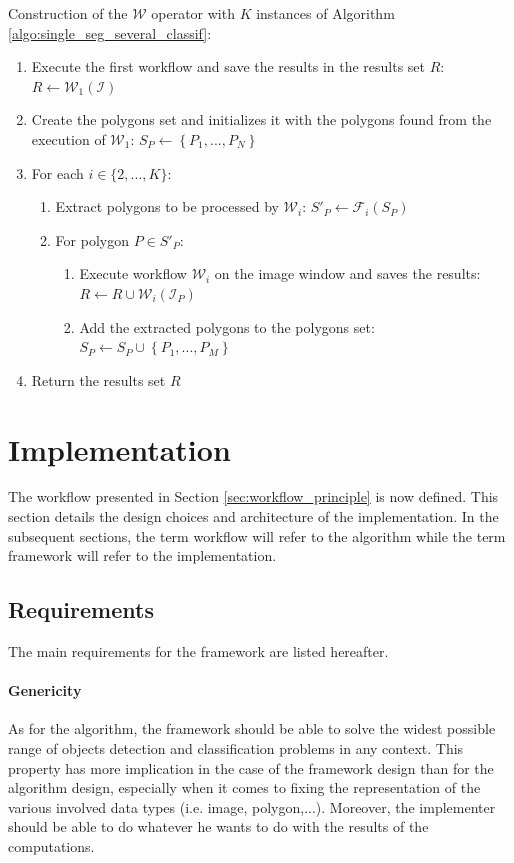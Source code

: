 \begin{algorithm} \label{algo:chaining_workflows}
	Construction of the $\mathcal{W}$ operator with $K$ instances of Algorithm \ref{algo:single_seg_several_classif}:

	\begin{enumerate}
		\item Execute the first workflow and save the results in the results set $R$: $R \leftarrow \mathcal{W}_1(\mathcal{I})$
		\item Create the polygons set and initializes it with the polygons found from the execution of $\mathcal{W}_1$: $S_P \leftarrow \left\{P_1, ..., P_N\right\}$
		\item For each $i \in \{2, ..., K\}$:
		\begin{enumerate}
			\item Extract polygons to be processed by $\mathcal{W}_i$: $S'_P \leftarrow \mathcal{F}_i(S_P)$
			\item For polygon $P \in S'_P$:
			\begin{enumerate}
				\item Execute workflow $\mathcal{W}_i$ on the image window and saves the results: $R \leftarrow R \cup \mathcal{W}_i(\mathcal{I}_P)$
				\item Add the extracted polygons to the polygons set: $S_P \leftarrow S_P \cup \left\{P_1, ..., P_M\right\}$
			\end{enumerate}
		\end{enumerate}
		\item Return the results set $R$
	\end{enumerate}
\end{algorithm}

\section{Implementation}
\label{sec:workflow_impl}
The workflow presented in Section \ref{sec:workflow_principle} is now defined. This section details the design choices and architecture of the implementation. In the subsequent sections, the term workflow will refer to the algorithm while the term framework will refer to the implementation.

\subsection{Requirements}
The main requirements for the framework are listed hereafter.

\paragraph{Genericity} As for the algorithm, the framework should be able to solve the widest possible range of objects detection and classification problems in any context. This property has more implication in the case of the framework design than for the algorithm design, especially when it comes to fixing the representation of the various involved data types (i.e. image, polygon,...). Moreover, the implementer should be able to do whatever he wants to do with the results of the computations. 

